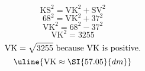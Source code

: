 \[\text{KS}^{2}=\text{VK}^{2}+\text{SV}^{2}\]
\[68^{2}=\text{VK}^{2}+37^{2}\]
\[\text{VK}^{2}=68^{2}-37^{2}\]
\[\text{VK}^{2}=3255\]
\[\text{VK}=\sqrt{\mathstrut 3255}\text{ because VK is positive.}\]
\[\uline{\text{VK}\approx\SI{57.05}{dm}}\]